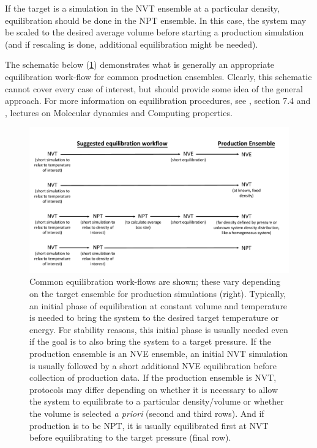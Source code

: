 \documentclass[9pt,bestpractices]{livecoms}
\begin{document}
If the target is a simulation in the NVT ensemble at a particular density, equilibration should be done in the NPT ensemble.
In this case, the system may be scaled to the desired average volume before starting a production simulation (and if rescaling is done, additional equilibration might be needed).

The schematic below (\ref{eqworkflow}) demonstrates what is generally an appropriate equilibration work-flow for common production ensembles.
Clearly, this schematic cannot cover every case of interest, but should provide some idea of the general approach.
For more information on equilibration procedures, see \citet{LeachBook}, section 7.4 and \citet{ShellNotes}, lectures on Molecular dynamics and Computing properties.

\begin{figure}[h]
\centering
\includegraphics[width=\linewidth]{Equilibration_Workflow.pdf}
\caption{Common equilibration work-flows are shown; these vary depending on the target ensemble for production simulations (right).
Typically, an initial phase of equilibration at constant volume and temperature is needed to bring the system to the desired target temperature or energy.
For stability reasons, this initial phase is usually needed even if the goal is to also bring the system to a target pressure.
If the production ensemble is an NVE ensemble, an initial NVT simulation is usually followed by a short additional NVE equilibration before collection of production data.
If the production ensemble is NVT, protocols may differ depending on whether it is necessary to allow the system to equilibrate to a particular density/volume or whether the volume is selected \emph{a priori} (second and third rows).
And if production is to be NPT, it is usually equilibrated first at NVT before equilibrating to the target pressure (final row).} 
\label{eqworkflow}
\end{figure}
\end{document}
